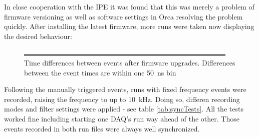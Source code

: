   In close cooperation with the IPE it was found that this was merely a problem of firmware versioning as well as software settings in Orca resolving the problem quickly. After installing the latest firmware, more runs were taken now displaying the desired behaviour:
  \begin{figure}
	\caption[Synchronisation new firmware]{Time differences between events after firmware upgrades. Differences between the event times are within one \SI{50}{\nano\second} bin}
	\includegraphics[width = 0.9 \textwidth]{graphics/dummy.eps}
  \end{figure}
  Following the manually triggered events, runs with fixed frequency events were recorded, raising the frequency to up to \SI{10}{\kilo\hertz}. Doing so, differen recording modes and filter settings were applied - see table \ref{tab:syncTests}. All the tests worked fine including starting one DAQ's run way ahead of the other. Those events recorded in both run files were always well synchronized.
